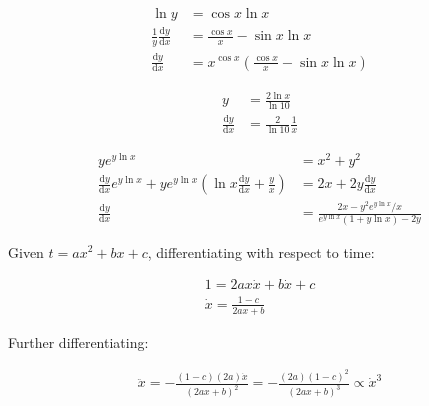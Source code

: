 \documentclass[12pt]{article}
\begin{document}
\begin{equation}
    \begin{split}
        \ln{y} &= \cos{x} \ln{x} \\
        \frac{1}{y} \frac{\mathrm{d}y}{\mathrm{d}x} &= \frac{\cos{x}}{x} - \sin{x} \ln{x} \\
        \frac{\mathrm{d}y}{\mathrm{d}x} &= x^{\cos{x}} \left( \frac{\cos{x}}{x} - \sin{x} \ln{x} \right)
    \end{split}
\end{equation}

\begin{equation}
    \begin{split}
        y &= \frac{2\ln{x}}{\ln{10}} \\
        \frac{\mathrm{d}y}{\mathrm{d}x} &= \frac{2}{\ln{10}} \frac{1}{x}
    \end{split}
\end{equation}


\begin{equation}
    \begin{split}
        y e^{y \ln{x}} &= x^{2} + y^{2} \\
        \frac{\mathrm{d}y}{\mathrm{d}x} e^{y \ln{x}} + y e^{y \ln{x}} \left( \ln{x} \frac{\mathrm{d}y}{\mathrm{d}x} + \frac{y}{x} \right) &= 2x + 2y \frac{\mathrm{d}y}{\mathrm{d}x} \\
        \frac{\mathrm{d}y}{\mathrm{d}x} &= \frac{2x - y^{2} e^{y \ln{x}}/x}{e^{y \ln{x}}(1 + y\ln{x}) - 2y}
    \end{split}
\end{equation}

Given $t = ax^{2} + bx + c$, differentiating with respect to time:

\begin{equation}
    \begin{split}
        1 = 2ax \dot{x} + b\dot{x} + c \\
        \dot{x} = \frac{1 - c}{2ax + b}
    \end{split}
\end{equation}

Further differentiating:

\begin{equation}
    \begin{split}
        \ddot{x} = -\frac{(1 - c)(2a)\dot{x}}{(2ax + b)^{2}} = -\frac{(2a)(1 - c)^{2}}{(2ax + b)^{3}} \propto \dot{x}^{3}
    \end{split}
\end{equation}
\end{document}
